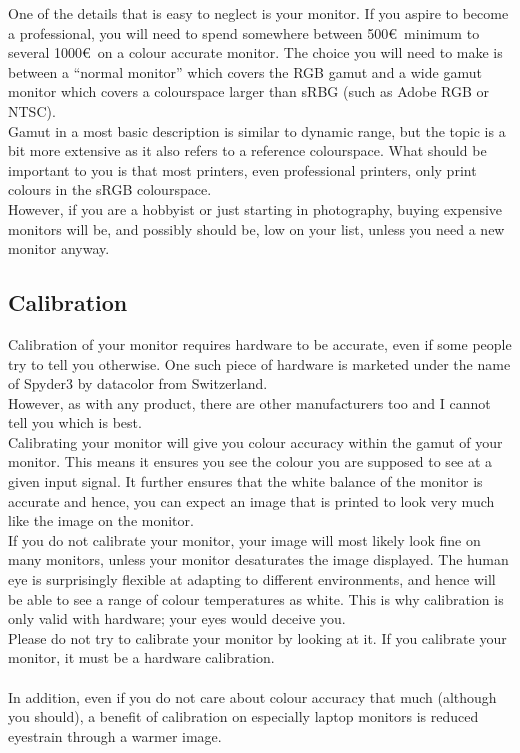 One of the details that is easy to neglect is your monitor. If you aspire to become a professional, you will need to spend somewhere between 500\euro\ minimum to several 1000\euro\ on a colour accurate monitor. The choice you will need to make is between a ``normal monitor'' which covers the RGB gamut and a wide gamut monitor which covers a \gls{colourspace} larger than sRBG (such as Adobe RGB or NTSC).
\\
Gamut in a most basic description is similar to dynamic range, but the topic is a bit more extensive as it also refers to a reference \gls{colourspace}. What should be important to you is that most printers, even professional printers, only print colours in the sRGB \gls{colourspace}.
\\
However, if you are a hobbyist or just starting in photography, buying expensive monitors will be, and possibly should be, low on your list, unless you need a new monitor anyway.


\subsection{Calibration}

Calibration of your monitor requires hardware to be accurate, even if some people try to tell you otherwise. One such piece of hardware is marketed under the name of Spyder3 by datacolor from Switzerland. 
\\
However, as with any product, there are other manufacturers too and I cannot tell you which is best.
\\
Calibrating your monitor will give you colour accuracy within the gamut of your monitor. This means it ensures you see the colour you are supposed to see at a given input signal. It further ensures that the white balance of the monitor is accurate and hence, you can expect an image that is printed to look very much like the image on the monitor.
\\
If you do not calibrate your monitor, your image will most likely look fine on many monitors, unless your monitor desaturates the image displayed. The human eye is surprisingly flexible at adapting to different environments, and hence will be able to see a range of colour temperatures as white. This is why calibration is only valid with hardware; your eyes would deceive you.
\\
Please do not try to calibrate your monitor by looking at it. If you calibrate your monitor, it must be a hardware calibration.
\\
\\
In addition, even if you do not care about colour accuracy that much (although you should), a benefit of calibration on especially laptop monitors is reduced eyestrain through a warmer image.

